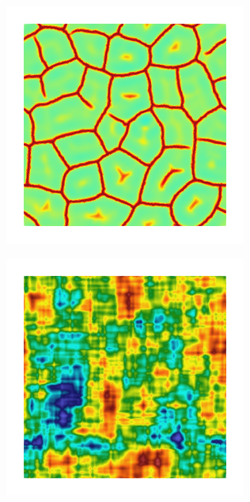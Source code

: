 \begin{figure}[!htb]
\begin{subfigure}[b]{0.15\textwidth}
    \end{subfigure}
    \begin{subfigure}[b]{0.15\textwidth}
        \includegraphics[width=\textwidth]{past/figures/d_sqexp_cartesian_10_10_rho_0_seed_a.png}
    \end{subfigure}
    \begin{subfigure}[b]{0.15\textwidth}
        \includegraphics[width=\textwidth]{past/figures/Gc_exp_cartesian_10_10_rho_0_seed_b.png}

\end{subfigure}
\end{figure}
